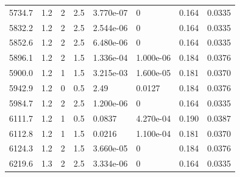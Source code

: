 \documentclass[preview]{standalone}
\begin{document}
{{{{\begin{tabular}{L{1.2cm}C{1.2cm} C{0.3cm}C{0.5cm} C{1.4cm}C{1.4cm} C{1.4cm}C{1.4cm}}
  5734.7  &   1.2  & 2     & 2.5 &  3.770e-07  & 0  & 0.164 &  0.0335   \\ 
  5832.2  &   1.2  & 2     & 2.5 &  2.544e-06  & 0  & 0.164 &  0.0335   \\ 
  5852.6  &   1.2  & 2     & 2.5 &  6.480e-06  & 0  & 0.164 &  0.0335   \\ 
  5896.1  &   1.2  & 2     & 1.5 &  1.336e-04  & 1.000e-06  & 0.184 &  0.0376   \\ 
  5900.0  &   1.2  & 1     & 1.5 &  3.215e-03  & 1.600e-05  & 0.181 &  0.0370   \\ 
  5942.9  &   1.2  & 0     & 0.5 &  2.49  & 0.0127  & 0.184 &  0.0376   \\ 
  5984.7  &   1.2  & 2     & 2.5 &  1.200e-06  & 0  & 0.164 &  0.0335   \\ 
  6111.7  &   1.2  & 1     & 0.5 &  0.0837  & 4.270e-04  & 0.190 &  0.0387   \\ 
  6112.8  &   1.2  & 1     & 1.5 &  0.0216  & 1.100e-04  & 0.181 &  0.0370   \\ 
  6124.3  &   1.2  & 2     & 1.5 &  3.660e-05  & 0  & 0.184 &  0.0376   \\ 
  6219.6  &   1.3  & 2     & 2.5 &  3.334e-06  & 0  & 0.164 &  0.0335   \\ 
\hline 
\end{tabular} 

}}}}
\end{document}
